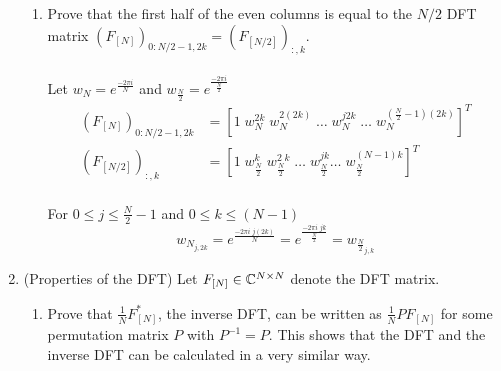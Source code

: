 \documentclass[12pt,twoside]{article}
\begin{document}
\begin{enumerate}
\begin{enumerate}
  \item Prove  that  the  first  half  of  the  even  columns  is  equal to  the $N/2$ DFT matrix $(F_{[N]})_{0:N/2-1,2k} = (F_{[N/2]})_{:,k}$.\\ \\
  Let $w_N = e^{\frac{-2\pi i} {N}}$ and $w_{\frac{N}{2}} =  e^{\frac{-2\pi i} {\frac{N}{2}}}$ 
  \begin{align*}
  	(F_{[N]})_{0:N/2-1,2k}	&= [1 \; w_N^{2k} \; w_N^{2 (2k)} \; \ldots \;  w_{N}^{j2k} \; \ldots \; w_N^{(\frac{N}{2} -1) (2k)} ]^T \\
  	(F_{[N/2]})_{:,k}			&= [1 \; w_{\frac{N}{2}}^k \; w_{\frac{N}{2}}^{2\;k} \; \ldots  \; w_{\frac{N}{2}}^{jk} \ldots \; w_{\frac{N}{2}}^{(N-1)k} ]^T \\
  \end{align*}
  
  For $0 \le j \le \frac{N}{2}-1$ and $0 \le k \le (N-1)$
  $$ w_{N_{j, 2k}} =  e^{\frac{-2\pi i \; j (2k)} {N}} =  e^{\frac{-2\pi i \; j k} {\frac{N}{2}}} =  w_{\frac{N}{2}_{j,k}}$$
  
   \end{enumerate}
 
 \newpage
 \item (Properties of the DFT)
  Let $F_{[N]}\in\mathbb{C}^{N\times N}$ denote the DFT matrix.
  \begin{enumerate}
  \item Prove that $\frac{1}{N}F_{[N]}^*$, the inverse DFT, can be
    written as $\frac{1}{N}PF_{[N]}$ for some permutation matrix $P$
    with $P^{-1}=P$.  This shows that the DFT and the inverse DFT can be
    calculated in a very similar way.
    

\end{enumerate}
\end{enumerate}
\end{document}
